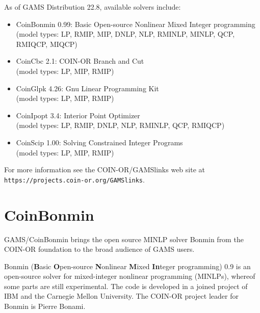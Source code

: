 As of GAMS Distribution 22.8, available solvers include:
\begin{itemize}
\item CoinBonmin 0.99: Basic Open-source Nonlinear Mixed Integer programming\\
(model types: LP, RMIP, MIP, DNLP, NLP, RMINLP, MINLP, QCP, RMIQCP, MIQCP)
\item CoinCbc 2.1: COIN-OR Branch and Cut\\
(model types: LP, MIP, RMIP)
\item CoinGlpk 4.26: Gnu Linear Programming Kit\\
(model types: LP, MIP, RMIP)
\item CoinIpopt 3.4: Interior Point Optimizer\\
(model types: LP, RMIP, DNLP, NLP, RMINLP, QCP, RMIQCP)
\item CoinScip 1.00: Solving Constrained Integer Programs\\
(model types: LP, MIP, RMIP)
\end{itemize}

% 

For more information see the COIN-OR/GAMSlinks web site at
\texttt{https://projects.coin-or.org/GAMSlinks}.

\section{CoinBonmin}

GAMS/CoinBonmin brings the open source MINLP solver Bonmin from the COIN-OR foundation to the broad audience of GAMS users.

Bonmin (\textbf{B}asic \textbf{O}pen-source \textbf{N}onlinear \textbf{M}ixed \textbf{In}teger programming) 0.9 is an open-source solver for mixed-integer nonlinear programming (MINLPs), whereof some parts are still experimental.
The code is developed in a joined project of IBM and the Carnegie Mellon University.
The COIN-OR project leader for Bonmin is Pierre Bonami.

